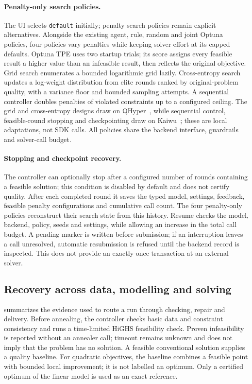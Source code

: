 \paragraph{Penalty-only search policies.}
The UI selects \texttt{default} initially; penalty-search policies remain explicit alternatives.
Alongside the existing agent, rule, random and joint Optuna policies, four policies vary penalties while
keeping solver effort at its capped defaults. Optuna TPE uses two startup trials; its score assigns every
feasible result a higher value than an infeasible result, then reflects the original objective. Grid search
enumerates a bounded logarithmic grid lazily. Cross-entropy search updates a log-weight distribution from
elite rounds ranked by original-problem quality, with a variance floor and bounded sampling attempts.
A sequential controller doubles penalties of violated constraints up to a configured ceiling. The grid and
cross-entropy designs draw on QHyper~\citep{qhyperDocs}, while sequential control, feasible-round stopping
and checkpointing draw on Kaiwu~\citep{kaiwuDocs}; these are local adaptations, not SDK calls.
All policies share the backend interface, guardrails and solver-call budget.

\paragraph{Stopping and checkpoint recovery.}
The controller can optionally stop after a configured number of rounds containing a feasible solution; this
condition is disabled by default and does not certify quality. After each completed round it saves the typed
model, settings, feedback, feasible penalty configurations and cumulative call count. The four penalty-only
policies reconstruct their search state from this history. Resume checks the model, backend, policy, seeds and
settings, while allowing an increase in the total call budget. A pending marker is written before submission;
if an interruption leaves a call unresolved, automatic resubmission is refused until the backend record is
inspected. This does not provide an exactly-once transaction at an external solver.

\subsection{Recovery across data, modelling and solving}
\label{sec:recovery}
 summarizes the evidence used to route a run through checking, repair and delivery.
Before annealing, the controller checks basic data and constraint consistency and runs a time-limited HiGHS
feasibility check. Proven infeasibility is reported without an annealer call; timeout remains unknown and
does not imply that the problem has no solution. A feasible conventional solution supplies a quality baseline.
For quadratic objectives, the baseline combines a feasible point with bounded local improvement; it is not
labelled an optimum. Only a certified optimum of the linear model is used as an exact reference.

